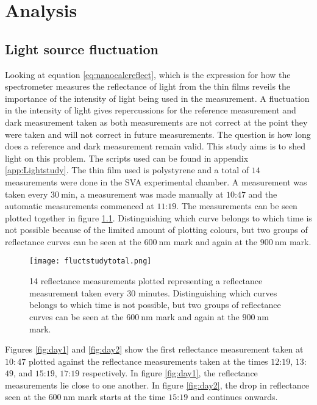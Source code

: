 \documentclass[MasterThesisMain.tex]{subfiles}
\begin{document}
\chapter{Analysis} \label{ch:analysis}

\section{Light source fluctuation}
Looking at equation \ref{eq:nanocalcreflect}, which is the expression for how the spectrometer measures the reflectance of light from the thin films reveils the importance of the intensity of light being used in the measurement. A fluctuation in the intensity of light gives repercussions for the reference measurement and dark measurement taken as both measurements are not correct at the point they were taken and will not correct in future measurements. The question is how long does a reference and dark measurement remain valid. This study aims is to shed light on this problem. The scripts used can be found in appendix \ref{app:Lightstudy}. The thin film used is polystyrene and a total of $14$ measurements were done in the SVA experimental chamber. A measurement was taken every $\SI{30}{\minute}$, a measurement was made manually at $10$:$47$ and the automatic measurements commenced at $11$:$19$. The measurements can be seen plotted together in figure \ref{fig:daytotal}. Distinguishing which curve belongs to which time is not possible because of the limited amount of plotting colours, but two groups of reflectance curves can be seen at the $\SI{600}{\nano\meter}$ mark and again at the $\SI{900}{\nano\meter}$ mark.
  
\begin{figure}
\centering
\texttt{[image: fluctstudytotal.png]}
\caption{14 reflectance measurements plotted representing a reflectance measurement taken every $30$ minutes. Distinguishing which curves belongs to which time is not possible, but two groups of reflectance curves can be seen at the $\SI{600}{\nano\meter}$ mark and again at the $\SI{900}{\nano\meter}$ mark.}
\label{fig:daytotal}
\end{figure}

Figures \ref{fig:day1} and \ref{fig:day2} show the first reflectance measurement taken at $10:47$ plotted against the reflectance measurements taken at the times $12$:$19$, $13$:$49$, and $15$:$19$, $17$:$19$ respectively. In figure \ref{fig:day1}, the reflectance measurements lie close to one another. In figure \ref{fig:day2}, the drop in reflectance seen at the $\SI{600}{\nano\meter}$ mark starts at the time $15$:$19$ and continues onwards. 
\end{document}

